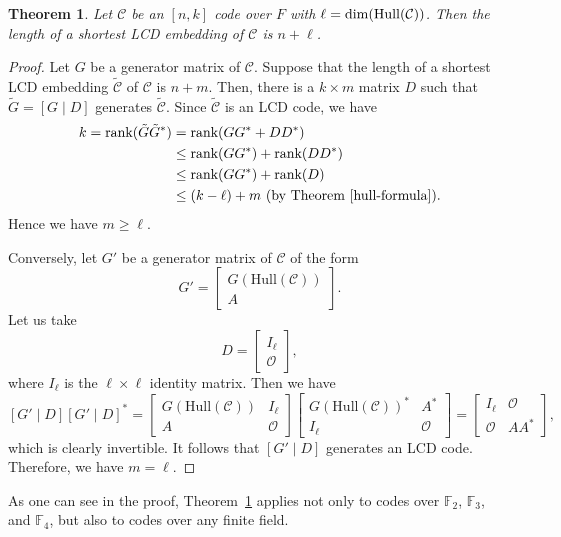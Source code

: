 \documentclass{article}
\newtheorem{theorem}{Theorem}[section]
\theoremstyle{definition}
\theoremstyle{remark}
\begin{document}
\begin{theorem}\label{shortestLCD}
    Let $\mathcal{C}$ be an $[n, k]$ code over $F$ with $\ell=\dim({\rm Hull}(\mathcal{C}))$. Then the length of a shortest LCD embedding of $\mathcal{C}$ is $n+\ell$.
\end{theorem}
\begin{proof}
Let $G$ be a generator matrix of $\mathcal{C}$. Suppose that the length of a shortest LCD embedding $\tilde{\mathcal{C}}$ of $\mathcal{C}$ is $n+m$. Then, there is a $k\times m$ matrix $D$ such that $\tilde{G}=[G\mid D]$ generates $\tilde{\mathcal{C}}$. Since $\tilde{\mathcal{C}}$ is an LCD code, we have
\begin{align*}
k=\text{rank}(\tilde{G}\tilde{G}^*)&=\text{rank}(GG^*+DD^*)\\&\le \text{rank}(GG^*)+\text{rank}(DD^*)\\&\le \text{rank}(GG^*)+\text{rank}(D) \\ 
& \le (k-\ell)+m {\mbox{~(by Theorem~\ref{hull-formula})}}.
\end{align*}
Hence we have $m\ge \ell$.

Conversely, let $G'$ be a generator matrix of $\mathcal{C}$ of the form
\[
G'=\begin{bmatrix}
    G(\text{Hull}(\mathcal{C}))\\A
\end{bmatrix}.
\]
Let us take
\[
D=\begin{bmatrix}
    I_\ell\\\mathcal{O}
\end{bmatrix},
\]
where $I_\ell$ is the $\ell\times \ell$ identity matrix. Then we have
\[
[G'\mid D][G'\mid D]^*=\begin{bmatrix}
    G(\text{Hull}(\mathcal{C})) & I_\ell\\A & \mathcal{O}
\end{bmatrix}\begin{bmatrix}
    G(\text{Hull}(\mathcal{C}))^* & A^*\\I_\ell & \mathcal{O}
\end{bmatrix}=\begin{bmatrix}
    I_\ell & \mathcal{O}\\\mathcal{O} & AA^*
\end{bmatrix},
\]
which is clearly invertible. It follows that $[G'\mid D]$ generates an LCD code. Therefore, we have $m=\ell$.
\end{proof}
As one can see in the proof, Theorem~\ref{shortestLCD} applies not only to codes over $\mathbb{F}_2$, $\mathbb{F}_3$, and $\mathbb{F}_4$, but also to codes over any finite field.
\end{document}
